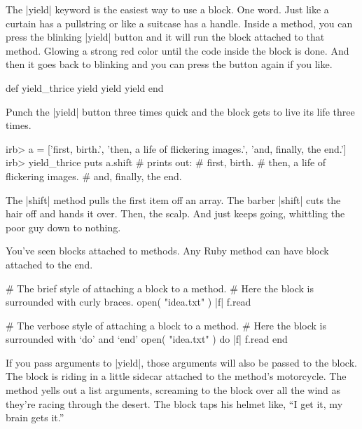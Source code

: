 \documentclass[12pt,twoside]{report}
\begin{document}
The \rubyinline|yield| keyword is the easiest way to
use a block.  One word.  Just like a curtain has a pullstring or like
a suitcase has a handle.  Inside a method, you can press the blinking
\rubyinline|yield| button and it will run the block
attached to that method.  Glowing a strong red color until the code
inside the block is done.  And then it goes back to blinking and you
can press the button again if you like.


\begin{rubycode}

 def yield_thrice
   yield
   yield
   yield
 end

\end{rubycode}


Punch the \rubyinline|yield| button three times quick
and the block gets to live its life three times.


\begin{consolecode}

 irb> a = ['first, birth.', 'then, a life of flickering images.',
           'and, finally, the end.']
 irb> yield_thrice { puts a.shift }
 # prints out:
 #   first, birth.
 #   then, a life of flickering images.
 #   and, finally, the end.

\end{consolecode}


The \rubyinline|shift| method pulls the first item off
an array.  The barber \rubyinline|shift| cuts the hair
off and hands it over.  Then, the scalp.  And just keeps going,
whittling the poor guy down to nothing.

You've seen blocks attached to methods.  Any Ruby method can have
block attached to the end.


\begin{rubycode}

 # The brief style of attaching a block to a method.
 # Here the block is surrounded with curly braces.
 open( "idea.txt" ) { |f| f.read }

 # The verbose style of attaching a block to a method.
 # Here the block is surrounded with `do' and `end'
 open( "idea.txt" ) do |f|
   f.read
 end

\end{rubycode}


If you pass arguments to \rubyinline|yield|, those
arguments will also be passed to the block. The block is riding in a
little sidecar attached to the method's motorcycle.  The method yells
out a list arguments, screaming to the block over all the wind as
they're racing through the desert.  The block taps his helmet like,
``I get it, my brain gets it.''
\end{document}
